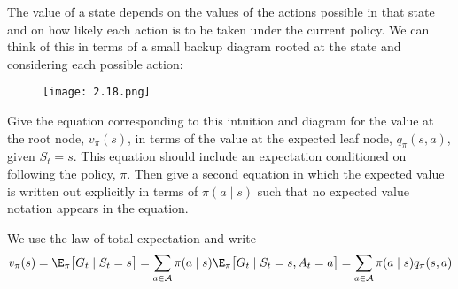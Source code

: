 \begin{exercise}
The value of a state depends on the values of the actions possible in that state and on how likely each action is to be taken under the current policy.
We can think of this in terms of a small backup diagram rooted at the state and considering each possible action:

\begin{figure}[H]
    \centering
    \texttt{[image: 2.18.png]}
    \caption{}
    \label{fig:2.18}
\end{figure}

Give the equation corresponding to this intuition and diagram for the value at the root node, $v_\pi(s)$, in terms of the value at the expected leaf node, $q_\pi(s, a)$, given $S_t = s$.
This equation should include an expectation conditioned on following the policy, $\pi$.
Then give a second equation in which the expected value is written out explicitly in terms of $\pi(a \mid s)$ such that no expected value notation appears in the equation.

\end{exercise}

\begin{solution}
  We use the law of total expectation and write
  \begin{align*}
    v_\pi(s)
    =
    \E_\pi\big[G_t \mid S_t = s\big]
    =
    \sum_{a \in \mathcal{A}} \pi(a\mid s)\E_\pi\big[G_t \mid S_t = s, A_t = a\big]
    =
    \sum_{a \in \mathcal{A}} \pi(a\mid s) q_\pi(s,a)
  \end{align*}
\end{solution}

